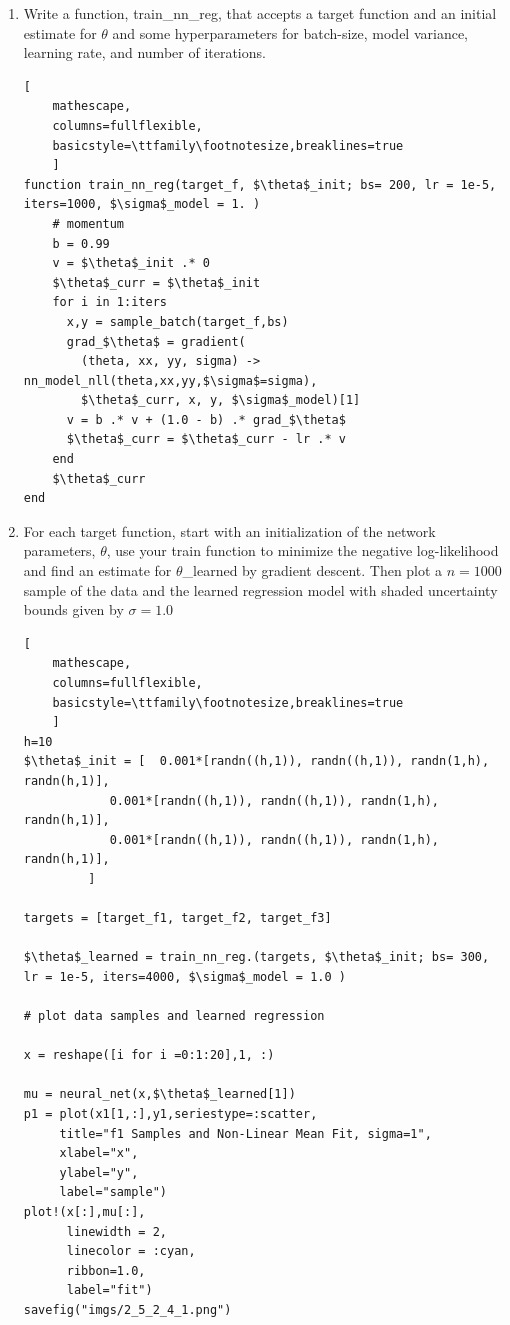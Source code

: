 \documentclass[12pt,letter]{article}
\begin{document}
\begin{enumerate}
\item Write a function, train\_nn\_reg, that accepts a target function and an initial estimate for $\theta$ and some hyperparameters for batch-size, model variance, learning rate, and number of iterations.

\begin{lstlisting}[
    mathescape,
    columns=fullflexible,
    basicstyle=\ttfamily\footnotesize,breaklines=true
    ]
function train_nn_reg(target_f, $\theta$_init; bs= 200, lr = 1e-5, iters=1000, $\sigma$_model = 1. )
    # momentum
    b = 0.99
    v = $\theta$_init .* 0
    $\theta$_curr = $\theta$_init
    for i in 1:iters
      x,y = sample_batch(target_f,bs)
      grad_$\theta$ = gradient(
        (theta, xx, yy, sigma) -> nn_model_nll(theta,xx,yy,$\sigma$=sigma),
        $\theta$_curr, x, y, $\sigma$_model)[1]
      v = b .* v + (1.0 - b) .* grad_$\theta$
      $\theta$_curr = $\theta$_curr - lr .* v
    end
    $\theta$_curr
end
\end{lstlisting}

\item For each target function, start with an initialization of the network parameters, $\theta$, use your train function to minimize the negative log-likelihood and find an estimate for $\theta$_learned by gradient descent. Then plot a $n=1000$ sample of the data and the learned regression model with shaded uncertainty bounds given by $\sigma = 1.0$

\begin{lstlisting}[
    mathescape,
    columns=fullflexible,
    basicstyle=\ttfamily\footnotesize,breaklines=true
    ]
h=10
$\theta$_init = [  0.001*[randn((h,1)), randn((h,1)), randn(1,h), randn(h,1)],
            0.001*[randn((h,1)), randn((h,1)), randn(1,h), randn(h,1)],
            0.001*[randn((h,1)), randn((h,1)), randn(1,h), randn(h,1)],
         ]

targets = [target_f1, target_f2, target_f3]

$\theta$_learned = train_nn_reg.(targets, $\theta$_init; bs= 300, lr = 1e-5, iters=4000, $\sigma$_model = 1.0 )

# plot data samples and learned regression

x = reshape([i for i =0:1:20],1, :)

mu = neural_net(x,$\theta$_learned[1])
p1 = plot(x1[1,:],y1,seriestype=:scatter,
     title="f1 Samples and Non-Linear Mean Fit, sigma=1",
     xlabel="x",
     ylabel="y",
     label="sample")
plot!(x[:],mu[:],
      linewidth = 2,
      linecolor = :cyan,
      ribbon=1.0,
      label="fit")
savefig("imgs/2_5_2_4_1.png")
      

\end{lstlisting}
\end{enumerate}
\end{document}
